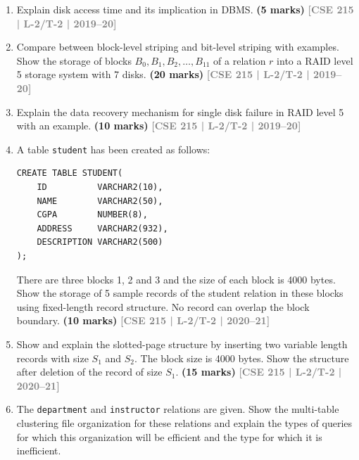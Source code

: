 \documentclass[12pt,a3paper]{article}
\newcommand{\yr}[1]{\hfill\textcolor{gray}{\small\textbf{[#1]}}}
\newcommand{\mk}[1]{\textcolor{orange!70!black}{\small\textbf{(#1 marks)}}}
\begin{document}
\begin{enumerate}
\item Explain disk access time and its implication in DBMS.
\mk{5} \yr{CSE 215 | L-2/T-2 | 2019--20}

\item Compare between block-level striping and bit-level striping with examples. Show the storage of blocks $B_0, B_1, B_2, \ldots, B_{11}$ of a relation $r$ into a RAID level 5 storage system with 7 disks.
\mk{20} \yr{CSE 215 | L-2/T-2 | 2019--20}

\item Explain the data recovery mechanism for single disk failure in RAID level 5 with an example.
\mk{10} \yr{CSE 215 | L-2/T-2 | 2019--20}

\item A table \texttt{student} has been created as follows:
\begin{lstlisting}
CREATE TABLE STUDENT(
    ID          VARCHAR2(10),
    NAME        VARCHAR2(50),
    CGPA        NUMBER(8),
    ADDRESS     VARCHAR2(932),
    DESCRIPTION VARCHAR2(500)
);
\end{lstlisting}
There are three blocks 1, 2 and 3 and the size of each block is 4000 bytes. Show the storage of 5 sample records of the student relation in these blocks using fixed-length record structure. No record can overlap the block boundary.
 \mk{10} \yr{CSE 215 | L-2/T-2 | 2020--21}

\item Show and explain the slotted-page structure by inserting two variable length records with size $S_1$ and $S_2$. The block size is 4000 bytes. Show the structure after deletion of the record of size $S_1$.
\mk{15} \yr{CSE 215 | L-2/T-2 | 2020--21}

\item The \texttt{department} and \texttt{instructor} relations are given. Show the multi-table clustering file organization for these relations and explain the types of queries for which this organization will be efficient and the type for which it is inefficient.


\end{enumerate}
\end{document}
